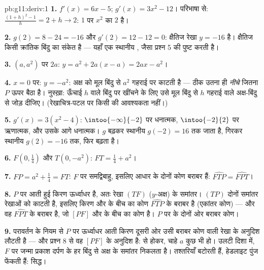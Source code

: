 \begin{solution}{pb:g11:deriv:1}
\textbf{1.} $f'(x) = 6x - 5$; $g'(x) = 3x^2 - 12$। परिभाषा से: $\frac{(1 + h)^2 - 1}{h} = 2 + h \to 2$: $1$ पर $x^2$ का  $2$
है।

\textbf{2.} $g(2) = 8 - 24 = -16$ और $g'(2) = 12 - 12 = 0$:  क्षैतिज रेखा $y = -16$ है। क्षैतिज
 किसी क्रांतिक बिंदु का संकेत है --- यहाँ एक स्थानीय ,
जैसा प्रश्न 5 की  पुष्ट करती है।

\textbf{3.} $(a, a^2)$ पर  $2a$: $y = a^2 + 2a(x - a) = 2ax - a^2$।

\textbf{4.} $x = 0$ पर: $y = -a^2$:  अक्ष को मूल बिंदु से $a^2$ गहराई पर
काटती है --- ठीक उतना ही \emph{नीचे} जितना $P$ ऊपर बैठा है। नुस्ख़ा: ऊँचाई
$h$ वाले बिंदु पर  खींचने के लिए उसे मूल बिंदु से $h$ गहराई
वाले अक्ष-बिंदु से जोड़ दीजिए। (रेखाचित्र-पटल पर किसी  की आवश्यकता
नहीं।)

\textbf{5.} $g'(x) = 3(x^2 - 4)$: $\intoo{-\infty}{-2}$ पर धनात्मक, $\intoo{-2}{2}$ पर ऋणात्मक, और उसके आगे धनात्मक।
$g$ बढ़कर स्थानीय  $g(-2) = 16$ तक जाता है, गिरकर स्थानीय  $g(2) = -16$ तक,
फिर बढ़ता है।

\textbf{6.} $F\left(0, \frac14\right)$ और $T(0, -a^2)$: $FT = \frac14 + a^2$।

\textbf{7.} $FP = a^2 + \frac14 = FT$: $F$ पर समद्विबाहु, इसलिए आधार के दोनों कोण बराबर हैं:
$\widehat{FTP} = \widehat{FPT}$।

\textbf{8.} $P$ पर आती हुई किरण ऊर्ध्वाधर है, अतः रेखा $(TF)$ ($y$-अक्ष)
के समांतर।  $(TP)$ दोनों समांतर रेखाओं को काटती है, इसलिए किरण और
 के बीच का कोण $\widehat{FTP}$ के बराबर है (एकांतर कोण) --- और वह $\widehat{FPT}$ के
बराबर है, जो $[PF]$ और  के बीच का कोण है। $P$ पर  के
दोनों ओर बराबर कोण।

\textbf{9.} परावर्तन के नियम से $P$ पर ऊर्ध्वाधर आती किरण दूसरी ओर उसी
बराबर कोण वाली रेखा के अनुदिश लौटती है --- और प्रश्न 8 से वह $[PF]$ के अनुदिश
है:  से होकर, चाहे $a$ कुछ भी हो। उलटी दिशा में, $F$ पर जन्मा प्रकाश
दर्पण के हर बिंदु से अक्ष के समांतर निकलता है। तश्तरियाँ बटोरती हैं,
हेडलाइट पुंज फेंकती हैं: सिद्ध।


\end{solution}
